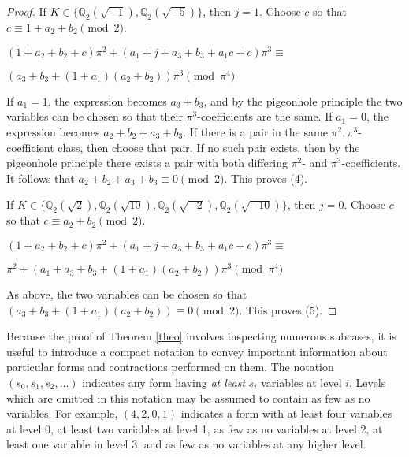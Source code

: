 \documentclass[12pt]{amsart}
\begin{document}
\begin{proof}
\bigskip

If $K \in \{\mathbb{Q}_2(\sqrt{-1}), \mathbb{Q}_2(\sqrt{-5})\}$, then $j=1$.  Choose $c$ so that $c \equiv 1 + a_2 + b_2 \pmod{2}$.

\smallskip

$(1 + a_2 + b_2 + c)\pi^2 + (a_1 + j + a_3 + b_3 + a_1c + c)\pi^3 \equiv$

$(a_3 + b_3 + (1 + a_1)(a_2 + b_2))\pi^3 \pmod{\pi^4}$

\smallskip

If $a_1 = 1$, the expression becomes $a_3 + b_3$, and by the pigeonhole principle the two variables can be chosen so that their $\pi^3$-coefficients are the same.  If $a_1=0$, the expression becomes $a_2 + b_2 + a_3 + b_3$.  If there is a pair in the same $\pi^2,\pi^3$-coefficient class, then choose that pair.  If no such pair exists, then by the pigeonhole principle there exists a pair with both differing $\pi^2$- and $\pi^3$-coefficients.  It follows that $a_2 + b_2 + a_3 + b_3 \equiv 0 \pmod{2}$.  This proves (4).

\bigskip

If $K \in \{\mathbb{Q}_2(\sqrt{2}), \mathbb{Q}_2(\sqrt{10}), \mathbb{Q}_2(\sqrt{-2}), \mathbb{Q}_2(\sqrt{-10})\}$, then $j=0$.  Choose $c$ so that $c \equiv a_2 + b_2 \pmod{2}$.

\smallskip

$(1 + a_2 + b_2 + c)\pi^2 + (a_1 + j + a_3 + b_3 + a_1c + c)\pi^3 \equiv$

$\pi^2 + (a_1 + a_3 + b_3 + (1 + a_1)(a_2 + b_2))\pi^3 \pmod{\pi^4}$

\smallskip

As above, the two variables can be chosen so that $(a_3 + b_3 + (1 + a_1)(a_2 + b_2)) \equiv 0 \pmod{2}$.  This proves (5).
\end{proof}

Because the proof of Theorem \ref{theo} involves inspecting numerous subcases, it is useful to introduce a compact notation to convey important information about particular forms and contractions performed on them.  The notation $(s_0, s_1, s_2, \ldots)$ indicates any form having \textit{at least} $s_i$ variables at level $i$.  Levels which are omitted in this notation may be assumed to contain as few as no variables.  For example, $(4, 2, 0, 1)$ indicates a form with at least four variables at level 0, at least two variables at level 1, as few as no variables at level 2, at least one variable in level 3, and as few as no variables at any higher level.
\end{document}
